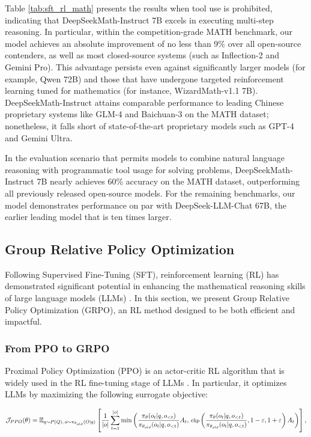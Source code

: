 \begin{itemize}[topsep=0pt]
Table \ref{tab:sft_rl_math} presents the results when tool use is prohibited, indicating that DeepSeekMath-Instruct 7B excels in executing multi-step reasoning. In particular, within the competition-grade MATH benchmark, our model achieves an absolute improvement of no less than 9\% over all open-source contenders, as well as most closed-source systems (such as Inflection-2 and Gemini Pro). This advantage persists even against significantly larger models (for example, Qwen 72B) and those that have undergone targeted reinforcement learning tuned for mathematics (for instance, WizardMath-v1.1 7B). DeepSeekMath-Instruct attains comparable performance to leading Chinese proprietary systems like GLM-4 and Baichuan-3 on the MATH dataset; nonetheless, it falls short of state-of-the-art proprietary models such as GPT-4 and Gemini Ultra.

In the evaluation scenario that permits models to combine natural language reasoning with programmatic tool usage for solving problems, DeepSeekMath-Instruct 7B nearly achieves 60\% accuracy on the MATH dataset, outperforming all previously released open-source models. For the remaining benchmarks, our model demonstrates performance on par with DeepSeek-LLM-Chat 67B, the earlier leading model that is ten times larger.

\subsection{Group Relative Policy Optimization} Following Supervised Fine-Tuning (SFT), reinforcement learning (RL) has demonstrated significant potential in enhancing the mathematical reasoning skills of large language models (LLMs) \citep{wang2023math,wizardmath}. In this section, we present Group Relative Policy Optimization (GRPO), an RL method designed to be both efficient and impactful.

\subsubsection{From PPO to GRPO} Proximal Policy Optimization (PPO) \citep{schulman2017proximal} is an actor-critic RL algorithm that is widely used in the RL fine-tuning stage of LLMs \citep{ouyang2022training}. In particular, it optimizes LLMs by maximizing the following surrogate objective:

\begin{equation}
\footnotesize
    \mathcal{J}_{PPO}(\theta) = \mathbb{E}_{q \sim P(Q),\, o \sim \pi_{\theta_{old}}(O|q)} \left[ \frac{1}{|o|} \sum_{t=1}^{|o|} \min \left( \frac{\pi_\theta(o_{t} | q, o_{<t})}{\pi_{\theta_{old}}(o_{t} | q, o_{<t})} A_{t},\, \text{clip} \left( \frac{\pi_\theta(o_{t} | q, o_{<t})}{\pi_{\theta_{old}}(o_{t} | q, o_{<t})}, 1 - \varepsilon, 1 + \varepsilon \right) A_{t} \right) \right],
\end{equation}


\end{itemize}
